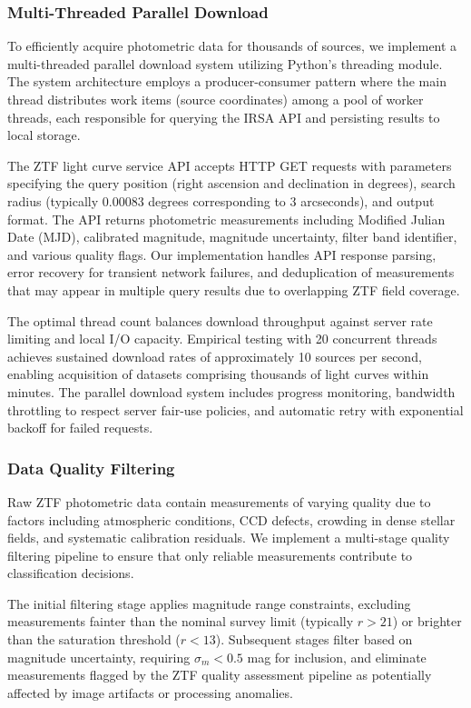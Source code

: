 \documentclass[11pt,a4paper]{article}
\begin{document}
\subsubsection{Multi-Threaded Parallel Download}

To efficiently acquire photometric data for thousands of sources, we implement a multi-threaded parallel download system utilizing Python's threading module. The system architecture employs a producer-consumer pattern where the main thread distributes work items (source coordinates) among a pool of worker threads, each responsible for querying the IRSA API and persisting results to local storage.

The ZTF light curve service API accepts HTTP GET requests with parameters specifying the query position (right ascension and declination in degrees), search radius (typically 0.00083 degrees corresponding to 3 arcseconds), and output format. The API returns photometric measurements including Modified Julian Date (MJD), calibrated magnitude, magnitude uncertainty, filter band identifier, and various quality flags. Our implementation handles API response parsing, error recovery for transient network failures, and deduplication of measurements that may appear in multiple query results due to overlapping ZTF field coverage.

The optimal thread count balances download throughput against server rate limiting and local I/O capacity. Empirical testing with 20 concurrent threads achieves sustained download rates of approximately 10 sources per second, enabling acquisition of datasets comprising thousands of light curves within minutes. The parallel download system includes progress monitoring, bandwidth throttling to respect server fair-use policies, and automatic retry with exponential backoff for failed requests.

\subsubsection{Data Quality Filtering}

Raw ZTF photometric data contain measurements of varying quality due to factors including atmospheric conditions, CCD defects, crowding in dense stellar fields, and systematic calibration residuals. We implement a multi-stage quality filtering pipeline to ensure that only reliable measurements contribute to classification decisions.

The initial filtering stage applies magnitude range constraints, excluding measurements fainter than the nominal survey limit (typically $r > 21$) or brighter than the saturation threshold ($r < 13$). Subsequent stages filter based on magnitude uncertainty, requiring $\sigma_m < 0.5$ mag for inclusion, and eliminate measurements flagged by the ZTF quality assessment pipeline as potentially affected by image artifacts or processing anomalies.
\end{document}
